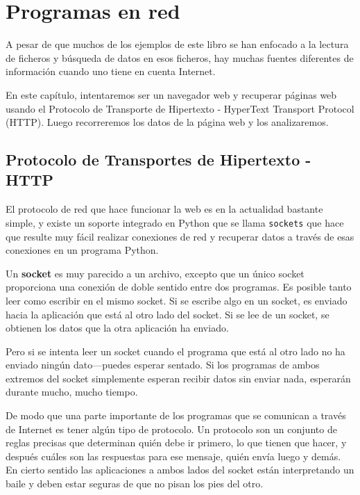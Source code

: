 
\chapter{Programas en red}

A pesar de que muchos de los ejemplos de este libro se han enfocado a la lectura
de ficheros y búsqueda de datos en esos ficheros, hay muchas fuentes
diferentes de información cuando uno tiene en cuenta Internet.

En este capítulo, intentaremos ser un navegador web y recuperar páginas
web usando el Protocolo de Transporte de Hipertexto - HyperText Transport Protocol (HTTP).
Luego recorreremos los datos de la página web y los analizaremos.

\section{Protocolo de Transportes de Hipertexto - HTTP}

El protocolo de red que hace funcionar la web es en la actualidad bastante simple, y
existe un soporte integrado en Python que se llama {\tt sockets} que hace que resulte muy
fácil realizar conexiones de red y recuperar datos a través de esas
conexiones en un programa Python.

Un {\bf socket} es muy parecido a un archivo, excepto que un único socket
proporciona una conexión de doble sentido entre dos programas.
Es posible tanto leer como escribir en el mismo socket. Si se escribe algo en
un socket, es enviado hacia la aplicación que está al otro lado del socket. Si se lee
de un socket, se obtienen los datos que la otra aplicación ha enviado.

Pero si se intenta leer un socket cuando el programa que está al otro lado
no ha enviado ningún dato---puedes esperar sentado. Si los programas de ambos extremos
del socket simplemente esperan recibir datos sin enviar nada, esperarán durante mucho,
mucho tiempo.

De modo que una parte importante de los programas que se comunican a través de Internet es tener algún
tipo de protocolo. Un protocolo son un conjunto de reglas precisas que determinan quién
debe ir primero, lo que tienen que hacer, y después cuáles son las respuestas para ese mensaje,
quién envía luego y demás. En cierto sentido las aplicaciones a ambos lados del
socket están interpretando un baile y deben estar seguras de que no pisan los pies del otro.

